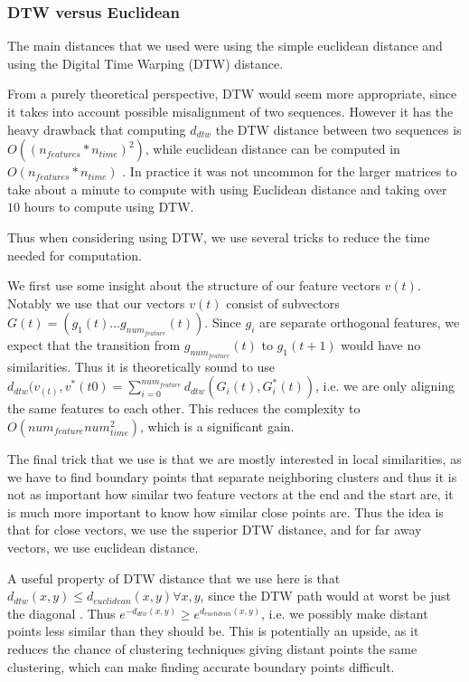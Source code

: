\subsubsection{DTW versus Euclidean}
The main distances that we used were  using the simple euclidean distance and using the Digital Time Warping (DTW) distance. 

From a purely theoretical perspective, DTW would seem more appropriate, since it takes into account possible misalignment of two sequences. However it has the heavy drawback that computing $d_{dtw}$ the DTW distance between two sequences is $O((n_{features}*n_{time})^2)$, while euclidean distance can be computed in $O(n_{features}*n_{time})$ . In practice it was not uncommon for the larger matrices to take about a minute to compute with using Euclidean distance and taking over $10$ hours to compute using DTW.

Thus when considering using DTW, we use several tricks to reduce the time needed for computation.

We first use some insight about the structure of our feature vectors $v(t)$. Notably we use that our vectors $v(t)$ consist of subvectors $G(t)=(g_1(t) \ldots g_{num_{feature}}(t))$. Since $g_i$ are separate orthogonal features, we expect that the transition from $g_{num_{feature}}(t)$ to $g_1(t+1)$ would have no similarities.  Thus it is theoretically sound to use $d_{dtw}(v_(t),v^*(t0)=\sum\limits_{i=0}^{num_{feature}} d_{dtw} (G_i(t),G^*_i (t))$, i.e. we are only aligning the same features to each other. This reduces the complexity to $O(num_{feature}num_{time}^2)$, which is a significant gain. 

The final trick that we use is that we are mostly interested in local similarities, as we have to find boundary points that separate neighboring clusters and thus it is not as important how similar two feature vectors at the end and the start are, it is much more important to know how similar close points are. Thus the idea is that for close vectors, we use the superior DTW distance, and for far away vectors, we use euclidean distance. 

A useful property of DTW distance that we use here is that $d_{dtw}(x,y)\leq d_{euclidean}(x,y) \forall x,y$, since  the DTW path would at worst be just the diagonal . Thus $e^{-d_{dtw}(x,y)}\geq e^{d_{euclidean}(x,y)}$, i.e. we possibly make distant points less similar than they should be. This is potentially an upside, as it reduces the chance of clustering techniques giving distant points the same clustering, which can make finding accurate boundary points difficult.

